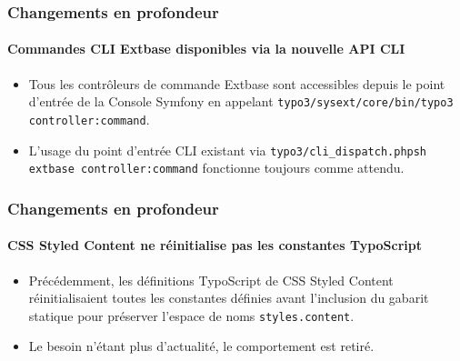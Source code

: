 \begin{frame}[fragile]
	\frametitle{Changements en profondeur}
	\framesubtitle{Commandes CLI Extbase disponibles via la nouvelle API CLI}

	\begin{itemize}
		\item Tous les contrôleurs de commande Extbase sont accessibles depuis le point
		 	d'entrée de la Console Symfony en appelant
			\texttt{typo3/sysext/core/bin/typo3 controller:command}.

		\item L'usage du point d'entrée CLI existant via
			\texttt{typo3/cli\_dispatch.phpsh extbase controller:command} fonctionne toujours comme attendu.
	\end{itemize}

\end{frame}



\begin{frame}[fragile]
	\frametitle{Changements en profondeur}
	\framesubtitle{CSS Styled Content ne réinitialise pas les constantes TypoScript}

	\begin{itemize}
		\item Précédemment, les définitions TypoScript de CSS Styled Content réinitialisaient toutes
			les constantes définies avant l'inclusion du gabarit statique pour préserver l'espace de
			noms \texttt{styles.content}.

		\item Le besoin n'étant plus d'actualité, le comportement est retiré.
	\end{itemize}

\end{frame}

